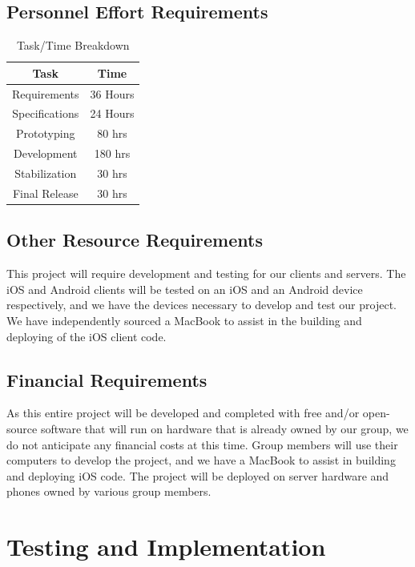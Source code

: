 \documentclass[11pt]{article}
\begin{document}
\subsection{Personnel Effort Requirements}
	\begin{table}[h!]
	\begin{center}
		\caption{Task/Time Breakdown}
		\label{tab:table1}
		\begin{tabular}{c|c}
		\textbf{Task} & \textbf{Time} \\
		\hline
		Requirements & 36 Hours \\
		Specifications & 24 Hours \\
		Prototyping & 80 hrs \\
		Development & 180 hrs \\
		Stabilization & 30 hrs \\
		Final Release & 30 hrs \\

		\end{tabular}
	\end{center}
	\end{table}
\subsection{Other Resource Requirements}
This project will require development and testing for our clients and servers. The iOS and Android clients will be tested on an iOS and an Android device respectively, and we have the devices necessary to develop and test our project. We have independently sourced a MacBook to assist in the building and deploying of the iOS client code. \\
\subsection{Financial Requirements}
As this entire project will be developed and completed with free and/or open-source software that will run on hardware that is already owned by our group, we do not anticipate any financial costs at this time. Group members will use their computers to develop the project, and we have a MacBook to assist in building and deploying iOS code. The project will be deployed on server hardware and phones owned by various group members. 

\newpage
\section{Testing and Implementation}
\end{document}
